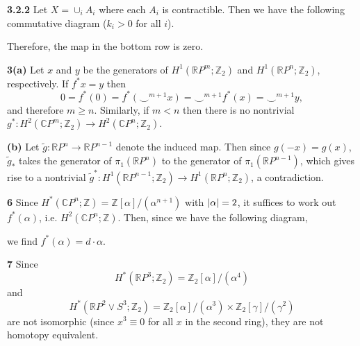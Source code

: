 \documentclass{article}
\makeatletter
\newcommand*{\shifttext}[1]{%
  \settowidth{\@tempdima}{#1}%
  \hspace{-\@tempdima}#1%
}
\newcommand{\plabel}[1]{%
\shifttext{\textbf{#1}\quad}%
}
\newcommand{\prule}{%
\begin{center}%
\hdashrule[0.5ex]{.99\linewidth}{1pt}{1pt 2.5pt}%
\end{center}%
}
\makeatother
\begin{document}
\prule

\plabel{3.2.2}%
Let $X = \cup_i A_i$ where each $A_i$ is contractible.
Then we have the following commutative diagram ($k_i>0$ for all $i$).
\begin{center}
\end{center}
Therefore, the map in the bottom row is zero.

\plabel{3(a)}%
Let $x$ and $y$ be the generators of $H^1(\mathbb{R}P^m;\mathbb{Z}_2)$ and $H^1(\mathbb{R}P^n;\mathbb{Z}_2)$, respectively.
If $f^*x = y$ then
\[ 0 = f^*(0) = f^*(\smile^{m+1} x) = \smile^{m+1} f^*(x) = \smile^{m+1}y, \]
and therefore $m\ge n$.
Similarly, if $m<n$ then there is no nontrivial $g^*:H^2(\mathbb{C}P^m;\mathbb{Z}_2)\rightarrow H^2(\mathbb{C}P^n;\mathbb{Z}_2)$.

\plabel{(b)}%
Let $\tilde{g}:\mathbb{R}P^n\rightarrow \mathbb{R}P^{n-1}$ denote the induced map.
Then since $g(-x) = g(x)$, $\tilde{g}_*$ takes the generator of $\pi_1(\mathbb{R}P^n)$ to the generator of $\pi_1(\mathbb{R}P^{n-1})$, which gives rise to a nontrivial $\tilde{g}^*:H^1(\mathbb{R}P^{n-1};\mathbb{Z}_2)\rightarrow H^1(\mathbb{R}P^n;\mathbb{Z}_2)$, a contradiction.

\plabel{6}%
\newcommand{\RP}{RP}%
\newcommand{\Hom}{Hom}%
Since $H^*(\mathbb{C}P^n;\mathbb{Z}) = \mathbb{Z}[\alpha]/(\alpha^{n+1})$ with $\abs{\alpha}=2$, it suffices to work out $f^*(\alpha)$, i.e. $H^2(\mathbb{C}P^n;\mathbb{Z})$.
Then, since we have the following diagram,
\begin{center}
\end{center}
we find $f^*(\alpha) = d\cdot \alpha$.

\plabel{7}%
Since
\[ H^*(\mathbb{R}P^3;\mathbb{Z}_2) = \mathbb{Z}_2[\alpha]/(\alpha^4) \]
and
\[ H^*(\mathbb{R}P^2 \vee S^3;\mathbb{Z}_2) = \mathbb{Z}_2[\alpha]/(\alpha^3) \times \mathbb{Z}_2[\gamma]/(\gamma^2) \]
are not isomorphic (since $x^3 \equiv 0$ for all $x$ in the second ring), they are not homotopy equivalent.
\end{document}
